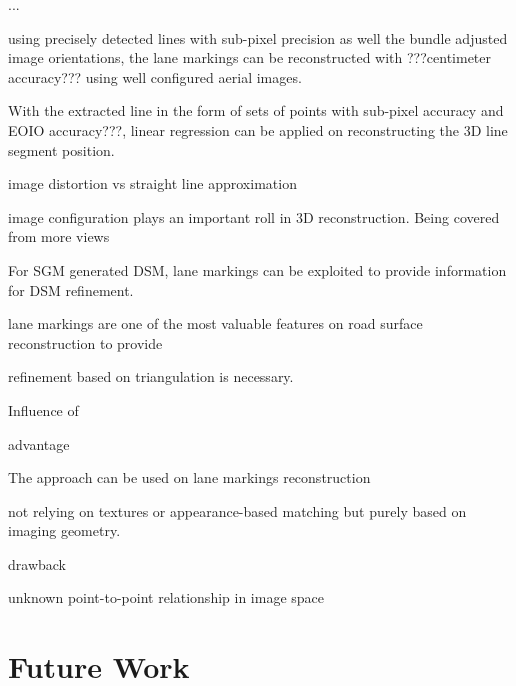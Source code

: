 ...

using precisely detected lines with sub-pixel precision as well the bundle adjusted image orientations, the lane markings can be reconstructed with ???centimeter accuracy??? using well configured aerial images.


With the extracted line in the form of sets of points with sub-pixel accuracy and EOIO accuracy???, linear regression can be applied on reconstructing the 3D line segment position.

image distortion vs straight line approximation


image configuration plays an important roll in 3D reconstruction. Being covered from more views



For SGM generated DSM, lane markings can be exploited to provide information for DSM refinement. 

lane markings are one of the most valuable features on road surface reconstruction to provide 

 refinement based on triangulation is necessary.



Influence of 


advantage

The approach can be used on lane markings reconstruction

not relying on textures or appearance-based matching
but purely based on imaging geometry.

drawback

unknown point-to-point relationship in image space




\section*{Future Work}
\label{chap:futurework}




